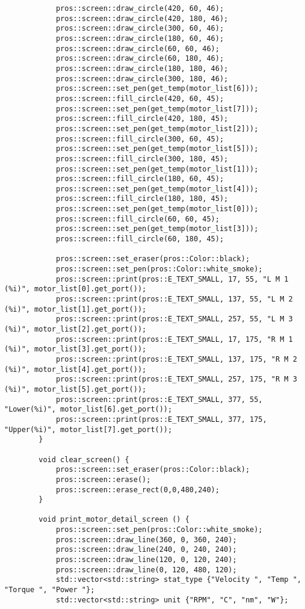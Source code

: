 \begin{verbatim}
            pros::screen::draw_circle(420, 60, 46);
            pros::screen::draw_circle(420, 180, 46);
            pros::screen::draw_circle(300, 60, 46);
            pros::screen::draw_circle(180, 60, 46);
            pros::screen::draw_circle(60, 60, 46);
            pros::screen::draw_circle(60, 180, 46);
            pros::screen::draw_circle(180, 180, 46);
            pros::screen::draw_circle(300, 180, 46);
            pros::screen::set_pen(get_temp(motor_list[6]));
            pros::screen::fill_circle(420, 60, 45);
            pros::screen::set_pen(get_temp(motor_list[7]));
            pros::screen::fill_circle(420, 180, 45);
            pros::screen::set_pen(get_temp(motor_list[2]));
            pros::screen::fill_circle(300, 60, 45);
            pros::screen::set_pen(get_temp(motor_list[5]));
            pros::screen::fill_circle(300, 180, 45);
            pros::screen::set_pen(get_temp(motor_list[1]));
            pros::screen::fill_circle(180, 60, 45);
            pros::screen::set_pen(get_temp(motor_list[4]));
            pros::screen::fill_circle(180, 180, 45);
            pros::screen::set_pen(get_temp(motor_list[0]));
            pros::screen::fill_circle(60, 60, 45);
            pros::screen::set_pen(get_temp(motor_list[3]));
            pros::screen::fill_circle(60, 180, 45);

            pros::screen::set_eraser(pros::Color::black);
            pros::screen::set_pen(pros::Color::white_smoke);
            pros::screen::print(pros::E_TEXT_SMALL, 17, 55, "L M 1 (%i)", motor_list[0].get_port());
            pros::screen::print(pros::E_TEXT_SMALL, 137, 55, "L M 2 (%i)", motor_list[1].get_port());
            pros::screen::print(pros::E_TEXT_SMALL, 257, 55, "L M 3 (%i)", motor_list[2].get_port());
            pros::screen::print(pros::E_TEXT_SMALL, 17, 175, "R M 1 (%i)", motor_list[3].get_port());
            pros::screen::print(pros::E_TEXT_SMALL, 137, 175, "R M 2 (%i)", motor_list[4].get_port());
            pros::screen::print(pros::E_TEXT_SMALL, 257, 175, "R M 3 (%i)", motor_list[5].get_port());
            pros::screen::print(pros::E_TEXT_SMALL, 377, 55, "Lower(%i)", motor_list[6].get_port());
            pros::screen::print(pros::E_TEXT_SMALL, 377, 175, "Upper(%i)", motor_list[7].get_port());
        }

        void clear_screen() {
            pros::screen::set_eraser(pros::Color::black);
            pros::screen::erase();
            pros::screen::erase_rect(0,0,480,240);
        }

        void print_motor_detail_screen () {
            pros::screen::set_pen(pros::Color::white_smoke);
            pros::screen::draw_line(360, 0, 360, 240);
            pros::screen::draw_line(240, 0, 240, 240);
            pros::screen::draw_line(120, 0, 120, 240);
            pros::screen::draw_line(0, 120, 480, 120);
            std::vector<std::string> stat_type {"Velocity ", "Temp ", "Torque ", "Power "};
            std::vector<std::string> unit {"RPM", "C", "nm", "W"};


\end{verbatim}
